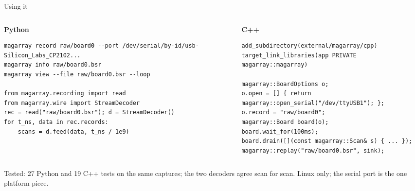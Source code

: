 \documentclass[aspectratio=169,11pt]{beamer}
\begin{document}
\begin{frame}[fragile]{Using it}
  \begin{columns}[T]
    \begin{column}{0.48\textwidth}
      \textbf{Python}
\begin{lstlisting}
magarray record raw/board0 --port /dev/serial/by-id/usb-Silicon_Labs_CP2102...
magarray info raw/board0.bsr
magarray view --file raw/board0.bsr --loop

from magarray.recording import read
from magarray.wire import StreamDecoder
rec = read("raw/board0.bsr"); d = StreamDecoder()
for t_ns, data in rec.records:
    scans = d.feed(data, t_ns / 1e9)
\end{lstlisting}
    \end{column}
    \begin{column}{0.48\textwidth}
      \textbf{C++}
\begin{lstlisting}
add_subdirectory(external/magarray/cpp)
target_link_libraries(app PRIVATE magarray::magarray)

magarray::BoardOptions o;
o.open = [] { return magarray::open_serial("/dev/ttyUSB1"); };
o.record = "raw/board0";
magarray::Board board(o);
board.wait_for(100ms);
board.drain([](const magarray::Scan& s) { ... });
magarray::replay("raw/board0.bsr", sink);
\end{lstlisting}
    \end{column}
  \end{columns}
  \vspace{1mm}
  \footnotesize Tested: 27 Python and 19 C++ tests on the same captures; the two decoders agree scan for scan. Linux only; the serial port is the one platform piece.
\end{frame}
\end{document}
